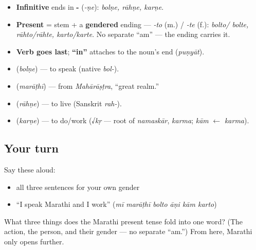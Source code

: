 \begin{grammarlens}[title={What you've built — the engine, in one look}]
\begin{itemize}
\raggedright
  \item \textbf{Infinitive} ends in \textbf{-} (\emph{-ṇe}): \emph{bolṇe, rāhṇe, karṇe}.
  \item \textbf{Present} = stem + a \textbf{gendered} ending — \emph{-to} (m.) / \emph{-te} (f.): \emph{bolto/ bolte, rāhto/rāhte, karto/karte}. No separate \textquotedblleft{}am\textquotedblright{} — the ending carries it.
  \item \textbf{Verb goes last}; \textbf{\textquotedblleft{}in\textquotedblright{}} attaches to the noun's end (\emph{puṇyāt}).
\end{itemize}
\end{grammarlens}

\begin{grammarlens}[title={What you've built — roots banked}]
\begin{itemize}
\raggedright
  \item \textbf{} (\emph{bolṇe}) — to speak (native \emph{bol-}).
  \item \textbf{} (\emph{marāṭhī}) — from \emph{Mahārāṣṭra}, \textquotedblleft{}great realm.\textquotedblright{}
  \item \textbf{} (\emph{rāhṇe}) — to live (Sanskrit \emph{rah-}).
  \item \textbf{} (\emph{karṇe}) — to do/work (√\emph{kṛ} — root of \emph{namaskār}, \emph{karma}; \emph{kām} $\leftarrow$ \emph{karma}).
\end{itemize}
\end{grammarlens}

\subsection*{Your turn}
Say these aloud:

\begin{itemize}
\raggedright
  \item all three sentences for your own gender
  \item \textquotedblleft{}I speak Marathi and I work\textquotedblright{} (\emph{mī marāṭhī bolto āṇi kām karto})
\end{itemize}

\begin{tcolorbox}[breakable,colback=teal!4,colframe=teal!35!black,title={Before you move on}]
What three things does the Marathi present tense fold into one word? (The action, the person, and their gender — no separate \textquotedblleft{}am.\textquotedblright{}) From here, Marathi only opens further.
\end{tcolorbox}
